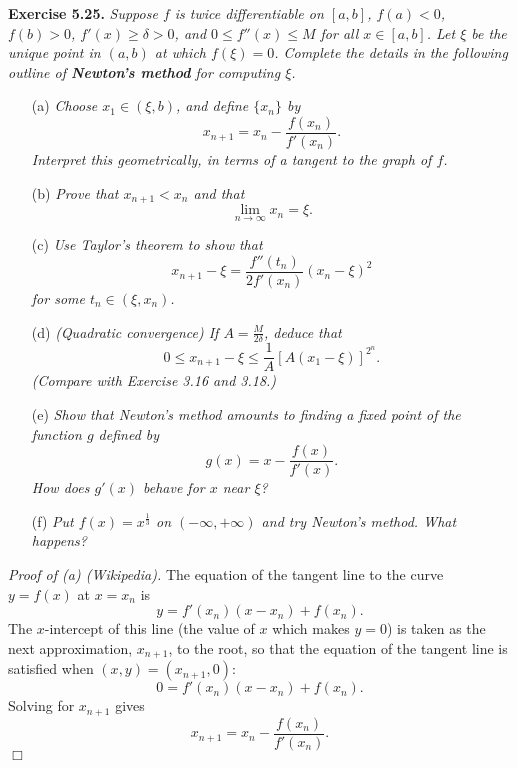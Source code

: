 \documentclass{article}
\begin{document}
\textbf{Exercise 5.25.}
\emph{Suppose $f$ is twice differentiable on $[a,b]$,
$f(a) < 0$, $f(b) > 0$, $f'(x) \geq \delta > 0$,
and $0 \leq f''(x) \leq M$ for all $x \in [a,b]$.
Let $\xi$ be the unique point in $(a,b)$ at which $f(\xi) = 0$.
Complete the details in the following outline of
\textbf{Newton's method} for computing $\xi$.}
\begin{enumerate}
\item[(a)]
\emph{Choose $x_1 \in (\xi,b)$, and define $\{ x_n \}$ by
\[
  x_{n+1} = x_n - \frac{f(x_n)}{f'(x_n)}.
\]
Interpret this geometrically, in terms of a tangent to the graph of $f$.}

\item[(b)]
\emph{Prove that $x_{n+1} < x_n$ and that
\[
  \lim_{n \to \infty}{x_n} = \xi.
\]}
\item[(c)]
\emph{Use Taylor's theorem to show that
\[
  x_{n+1} - \xi = \frac{f''(t_n)}{2 f'(x_n)} (x_n-\xi)^2
\]
for some $t_n \in (\xi,x_n)$.}

\item[(d)]
\emph{(Quadratic convergence)
If $A = \frac{M}{2\delta}$, deduce that
\[
  0 \leq x_{n+1} - \xi \leq \frac{1}{A} [A(x_1 - \xi)]^{2^n}.
\]
(Compare with Exercise 3.16 and 3.18.)}

\item[(e)]
\emph{Show that Newton's method amounts to finding a fixed point of the function $g$ defined by
\[
  g(x) = x - \frac{f(x)}{f'(x)}.
\]
How does $g'(x)$ behave for $x$ near $\xi$?}

\item[(f)]
\emph{Put $f(x) = x^{\frac{1}{3}}$ on $(-\infty, +\infty)$ and try Newton's method.
What happens?} \\
\end{enumerate}



\emph{Proof of (a) (Wikipedia).}
The equation of the tangent line to the curve $y = f(x)$ at $x = x_n$ is
\[
  y = f'(x_n)(x - x_n) + f(x_n).
\]
The $x$-intercept of this line (the value of $x$ which makes $y = 0$)
is taken as the next approximation, $x_{n+1}$, to the root,
so that the equation of the tangent line is satisfied when
$(x,y) = (x_{n+1},0)$:
\[
  0 = f'(x_n)(x - x_n) + f(x_n).
\]
Solving for $x_{n+1}$ gives
\[
  x_{n+1} = x_n - \frac{f(x_n)}{f'(x_n)}.
\]
$\Box$ \\
\end{document}
